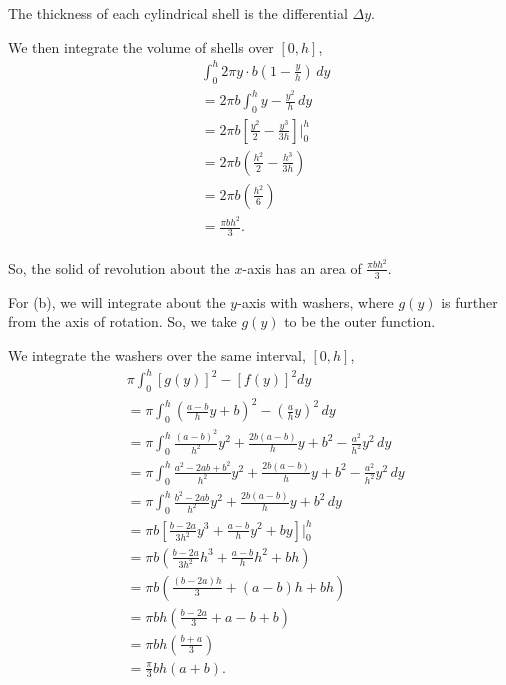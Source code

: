 \documentclass[../hw7.tex]{subfiles}
\begin{document}
The thickness of each cylindrical shell is the differential $\Delta y$.

We then integrate the volume of shells over $[0,h]$,
\begin{align*}
    &\int_{0}^{h} 2\pi y \cdot b\left( 1-\frac{y}{h} \right)\,dy \\
    &= 2\pi b \int_{0}^{h} y-\frac{y^2}{h}\,dy \\
    &= 2\pi b \left[ \frac{y^2}{2} - \frac{y^3}{3h} \right] \bigg\vert_{0}^{h} \\
    &= 2\pi b \left( \frac{h^2}{2} - \frac{h^3}{3h} \right) \\
    &= 2\pi b \left( \frac{h^2}{6} \right) \\
    &= \frac{\pi bh^2}{3}. \\
\end{align*}

So, the solid of revolution about the $x$-axis has an area of $\frac{\pi bh^2}{3}$.

For (b), we will integrate about the $y$-axis with washers, where $g(y)$ is further from the axis of rotation. So, we take $g(y)$ to be the outer function.

We integrate the washers over the same interval, $[0,h]$,
\begin{align*}
    & \pi \int_{0}^{h} {[g(y)]}^2-{[f(y)]}^2dy \\
    &= \pi \int_{0}^{h} {\left( \frac{a-b}{h}y + b \right)}^2 - {\left( \frac{a}{h}y \right)}^2 \, dy \\
    &= \pi \int_{0}^{h} \frac{{(a-b)}^2}{h^2}y^2+\frac{2b(a-b)}{h}y+b^2-\frac{a^2}{h^2}y^2\,dy \\
    &= \pi \int_{0}^{h} \frac{a^2-2ab+b^2}{h^2}y^2+\frac{2b(a-b)}{h}y+b^2-\frac{a^2}{h^2}y^2\,dy \\
    &= \pi \int_{0}^{h} \frac{b^2-2ab}{h^2}y^2+\frac{2b(a-b)}{h}y+b^2\,dy \\
    &= \pi b \left[ \frac{b-2a}{3h^2}y^3+\frac{a-b}{h}y^2+by \right] \Bigg\vert_{0}^{h} \\
    &= \pi b \left( \frac{b-2a}{3h^2}h^3+\frac{a-b}{h}h^2+bh \right) \\
    &= \pi b \left( \frac{(b-2a)h}{3} + (a-b)h + bh \right) \\
    &= \pi bh \left( \frac{b-2a}{3}+a-b+b\right) \\
    &= \pi bh \left( \frac{b+a}{3} \right) \\
    &= \frac{\pi}{3}bh(a+b). \\
\end{align*}
\end{document}
